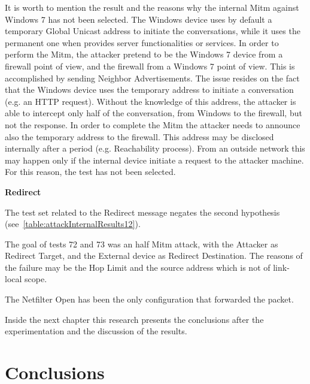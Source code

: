 \documentclass[12pt]{article}
\begin{document}
It is worth to mention the result and the reasons why the internal Mitm against Windows 7 has not been selected. The Windows device uses by default a temporary Global Unicast address to initiate the conversations, while it uses the permanent one when provides server functionalities or services. In order to perform the Mitm, the attacker pretend to be the Windows 7 device from a firewall point of view, and the firewall from a Windows 7 point of view. This is accomplished by sending Neighbor Advertisements. The issue resides on the fact that the Windows device uses the temporary address to initiate a conversation (e.g. an HTTP request). Without the knowledge of this address, the attacker is able to intercept only half of the conversation, from Windows to the firewall, but not the response. In order to complete the Mitm the attacker needs to announce also the temporary address to the firewall. This address may be disclosed internally after a period (e.g. Reachability process). From an outside network this may happen only if the internal device initiate a request to the attacker machine. For this reason, the test has not been selected.

\textbf{Redirect}

The test set related to the Redirect message negates the second hypothesis (see~\cref{table:attackInternalResults12}).

The goal of tests 72 and 73 was an half Mitm attack, with the Attacker as Redirect Target, and the External device as Redirect Destination. The reasons of the failure may be the Hop Limit and the source address which is not of link-local scope.

The Netfilter Open has been the only configuration that forwarded the packet.


Inside the next chapter this research presents the conclusions after the experimentation and the discussion of the results.

\pagebreak

\section{Conclusions}
\label{sec:7}
\end{document}
